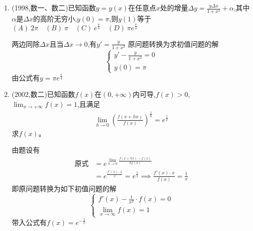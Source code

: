 \documentclass[12pt, a4paper, oneside, UTF8]{ctexbook}
\begin{document}
\begin{enumerate}[label=\arabic*.]
    \item (1998,数一、数二)已知函数$y=y(x)$在任意点$x$处的增量$\Delta y=\frac{y\Delta x}{1+x^2}+\alpha$,其中$\alpha$是$\Delta x$的高阶无穷小,$y(0)=\pi$,则$y(1)$等于 \\
    $(A)\ 2\pi \quad (B)\ \pi \quad (C)\ e^{\frac{\pi}{4}} \quad (D)\ \pi e^{\frac{\pi}{4}}$

    \begin{solution}
    两边同除$\Delta x$且当$\Delta x\to 0$,有$\displaystyle y'=\frac{y}{1+x^2}$ 原问题转换为求初值问题的解
    $$
    \begin{cases}
        \displaystyle y' - \frac{y}{1+x^2} = 0 \\
        y(0)=\pi
    \end{cases}
    $$
    由公式有$\displaystyle y=\pi e^{\frac{\pi}{4}}$ 
    \end{solution}
    
    \item (2002,数二)已知函数$f(x)$在$(0,+\infty)$内可导,$f(x)>0$,$\displaystyle\lim_{x\to+\infty}f(x)=1$,且满足
    \begin{align*}
        \lim_{h\to0}\left(\frac{f(x+hx)}{f(x)}\right)^{\frac{1}{h}}=e^{\frac{1}{x}}
    \end{align*}
    求$f(x)$。
    
    \begin{solution}
    由题设有
    \begin{align*}
        \text{原式} &= e^{\displaystyle\lim_{h\to 0}\frac{f(x+hx)-f(x)}{hf(x)}} \\
        &=e^{\frac{f'(x)\cdot x}{x}} = e^{\frac{1}{x}} \implies \frac{f'(x)\cdot x}{f(x)}=\frac{1}{x}
    \end{align*}
    即原问题转换为如下初值问题的解
    $$
    \begin{cases}
        \displaystyle 
        f'(x) - \frac{1}{x^2}\cdot f(x) = 0 \\
        \displaystyle
        \lim_{x\to\infty}f(x) = 1
    \end{cases}
    $$
    带入公式有$\displaystyle f(x)=e^{-\frac{1}{x}}$
    \end{solution}
\end{enumerate}
\end{document}
